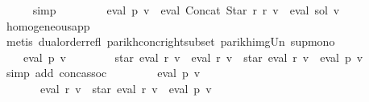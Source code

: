 \begin{isabellebody}
\ \ \ \ \isamarkupfalse%
\ simp\isanewline
\ \ \isamarkupfalse%
\ \isamarkupfalse%
\ {\isachardoublequoteopen}{\isasymdots}\ {\isasymsubseteq}\ {\isasymPsi}\ {\isacharparenleft}{\kern0pt}eval\ p\ v\ {\isasymunion}\ eval\ {\isacharparenleft}{\kern0pt}Concat\ {\isacharparenleft}{\kern0pt}Star\ {\isacharquery}{\kern0pt}r{\isacharparenright}{\kern0pt}\ {\isacharquery}{\kern0pt}r{\isacharparenright}{\kern0pt}\ v\ {\isacharat}{\kern0pt}{\isacharat}{\kern0pt}\ eval\ sol\ v{\isacharparenright}{\kern0pt}{\isachardoublequoteclose}\isanewline
\ \ \ \ \isamarkupfalse%
\ homogeneous{\isacharunderscore}{\kern0pt}app\ \isamarkupfalse%
\ {\isacharparenleft}{\kern0pt}metis\ dual{\isacharunderscore}{\kern0pt}order{\isachardot}{\kern0pt}refl\ parikh{\isacharunderscore}{\kern0pt}conc{\isacharunderscore}{\kern0pt}right{\isacharunderscore}{\kern0pt}subset\ parikh{\isacharunderscore}{\kern0pt}img{\isacharunderscore}{\kern0pt}Un\ sup{\isachardot}{\kern0pt}mono{\isacharparenright}{\kern0pt}\isanewline
\ \ \isamarkupfalse%
\ \isamarkupfalse%
\ {\isachardoublequoteopen}{\isasymdots}\ {\isacharequal}{\kern0pt}\ {\isasymPsi}\ {\isacharparenleft}{\kern0pt}eval\ p\ v{\isacharparenright}{\kern0pt}\ {\isasymunion}\isanewline
\ \ \ \ \ \ {\isasymPsi}\ {\isacharparenleft}{\kern0pt}star\ {\isacharparenleft}{\kern0pt}eval\ {\isacharquery}{\kern0pt}r\ v{\isacharparenright}{\kern0pt}\ {\isacharat}{\kern0pt}{\isacharat}{\kern0pt}\ eval\ {\isacharquery}{\kern0pt}r\ v\ {\isacharat}{\kern0pt}{\isacharat}{\kern0pt}\ star\ {\isacharparenleft}{\kern0pt}eval\ {\isacharquery}{\kern0pt}r\ v{\isacharparenright}{\kern0pt}\ {\isacharat}{\kern0pt}{\isacharat}{\kern0pt}\ eval\ p\ v{\isacharparenright}{\kern0pt}{\isachardoublequoteclose}\isanewline
\ \ \ \ \isamarkupfalse%
\ {\isacharparenleft}{\kern0pt}simp\ add{\isacharcolon}{\kern0pt}\ conc{\isacharunderscore}{\kern0pt}assoc{\isacharparenright}{\kern0pt}\isanewline
\ \ \isamarkupfalse%
\ \isamarkupfalse%
\ {\isachardoublequoteopen}{\isasymdots}\ {\isacharequal}{\kern0pt}\ {\isasymPsi}\ {\isacharparenleft}{\kern0pt}eval\ p\ v{\isacharparenright}{\kern0pt}\ {\isasymunion}\isanewline
\ \ \ \ \ \ {\isasymPsi}\ {\isacharparenleft}{\kern0pt}eval\ {\isacharquery}{\kern0pt}r\ v\ {\isacharat}{\kern0pt}{\isacharat}{\kern0pt}\ star\ {\isacharparenleft}{\kern0pt}eval\ {\isacharquery}{\kern0pt}r\ v{\isacharparenright}{\kern0pt}\ {\isacharat}{\kern0pt}{\isacharat}{\kern0pt}\ eval\ p\ v{\isacharparenright}{\kern0pt}{\isachardoublequoteclose}\isanewline

\end{isabellebody}
